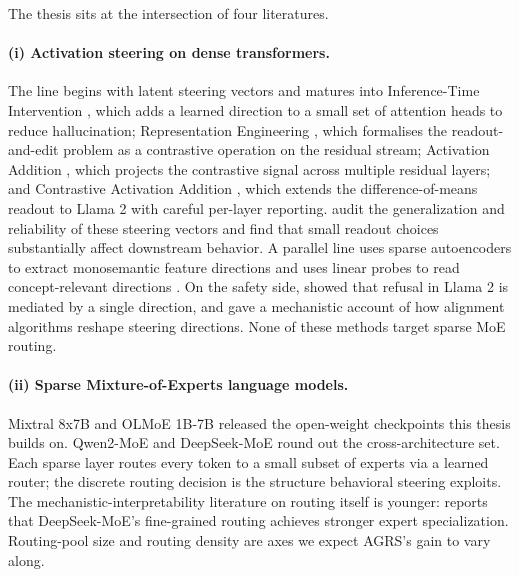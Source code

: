 \documentclass[11pt]{article}
\begin{document}
The thesis sits at the intersection of four literatures.

\paragraph{(i) Activation steering on dense transformers.}
The line begins with latent steering vectors
\citep{subramani2022extracting} and matures into Inference-Time
Intervention \citep{li2023iti}, which adds a learned direction to a
small set of attention heads to reduce hallucination; Representation
Engineering \citep{zou2023repe}, which formalises the
readout-and-edit problem as a contrastive operation on the residual
stream; Activation Addition \citep{turner2023activation}, which
projects the contrastive signal across multiple residual layers;
and Contrastive Activation Addition \citep{panickssery2024steering},
which extends the difference-of-means readout to Llama 2 with
careful per-layer reporting. \citet{tan2024analyzing} audit the
generalization and reliability of these steering vectors and find
that small readout choices substantially affect downstream
behavior. A parallel line uses sparse autoencoders to extract
monosemantic feature directions
\citep{bricken2023monosemanticity, templeton2024scaling,
marks2024sparse} and uses linear probes to read concept-relevant
directions \citep{alain2016probes, marks2023geometry}. On the
safety side, \citet{arditi2024refusal} showed that refusal in
Llama 2 is mediated by a single direction, and
\citet{lee2024mechanistic} gave a mechanistic account of how
alignment algorithms reshape steering directions. None of these
methods target sparse MoE routing.

\paragraph{(ii) Sparse Mixture-of-Experts language models.}
Mixtral 8x7B \citep{jiang2024mixtral} and OLMoE 1B-7B
\citep{muennighoff2024olmoe} released the open-weight checkpoints
this thesis builds on. Qwen2-MoE \citep{yang2024qwen2moe} and
DeepSeek-MoE \citep{dai2024deepseekmoe} round out the
cross-architecture set. Each sparse layer routes every token to a
small subset of experts via a learned router; the discrete routing
decision is the structure behavioral steering exploits. The
mechanistic-interpretability literature on routing itself is
younger: \citet{dai2024deepseekmoe} reports that DeepSeek-MoE's
fine-grained routing achieves stronger expert specialization.
Routing-pool size and routing density are axes we expect AGRS's
gain to vary along.
\end{document}
